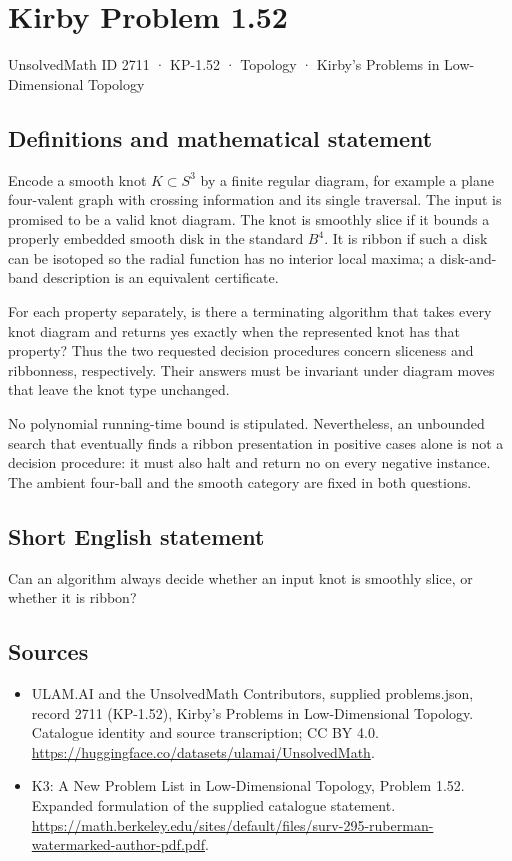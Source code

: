 \documentclass[11pt,a4paper]{article}
\begin{document}
\section*{Kirby Problem 1.52}\label{2711}
{\small UnsolvedMath ID 2711 · KP-1.52 · Topology · Kirby's Problems in Low-Dimensional Topology}
\subsection{Definitions and mathematical statement}
Encode a smooth knot $K\subset S^3$ by a finite regular diagram, for example a
plane four-valent graph with crossing information and its single traversal.
The input is promised to be a valid knot diagram. The knot is smoothly slice
if it bounds a properly embedded smooth disk in the standard $B^4$.
It is ribbon if such a disk can be isotoped so the radial function has no
interior local maxima; a disk-and-band description is an equivalent certificate.

For each property separately, is there a terminating algorithm that takes every
knot diagram and returns yes exactly when the represented knot has that
property? Thus the two requested decision procedures concern sliceness and
ribbonness, respectively. Their answers must be invariant under diagram moves
that leave the knot type unchanged.

No polynomial running-time bound is stipulated. Nevertheless, an unbounded
search that eventually finds a ribbon presentation in positive cases alone is
not a decision procedure: it must also halt and return no on every negative
instance. The ambient four-ball and the smooth category are fixed in both
questions.
\subsection{Short English statement}
Can an algorithm always decide whether an input knot is smoothly slice, or whether it is ribbon?
\subsection{Sources}
\begin{itemize}
\item[S1] ULAM.AI and the UnsolvedMath Contributors, supplied problems.json, record 2711 (KP-1.52), Kirby's Problems in Low-Dimensional Topology. Catalogue identity and source transcription; CC BY 4.0.
\url{https://huggingface.co/datasets/ulamai/UnsolvedMath}.
\item[S2] K3: A New Problem List in Low-Dimensional Topology, Problem 1.52. Expanded formulation of the supplied catalogue statement.
\url{https://math.berkeley.edu/sites/default/files/surv-295-ruberman-watermarked-author-pdf.pdf}.
\end{itemize}
\end{document}
